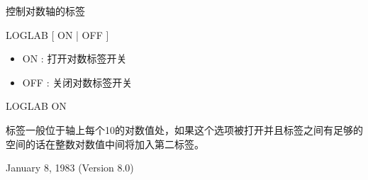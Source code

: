 \label{cmd:loglab}

控制对数轴的标签

LOGLAB [ ON | OFF ]

\begin{itemize}
\item ON : 打开对数标签开关 
\item OFF : 关闭对数标签开关 
\end{itemize}

LOGLAB ON

标签一般位于轴上每个10的对数值处，如果这个选项被打开并且标签之间有足够的空间的话在整数对数值中间将加入第二标签。

January 8, 1983 (Version 8.0)
